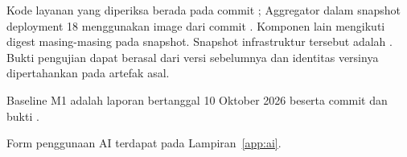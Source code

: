 \documentclass[11pt,a4paper]{report}
\begin{document}
Kode layanan yang diperiksa berada pada commit ; Aggregator dalam snapshot deployment 18 menggunakan image dari commit . Komponen lain mengikuti digest masing-masing pada snapshot. Snapshot infrastruktur tersebut adalah . Bukti pengujian dapat berasal dari versi sebelumnya dan identitas versinya dipertahankan pada artefak asal.

Baseline M1 adalah laporan bertanggal 10 Oktober 2026 beserta commit  dan bukti .

Form penggunaan AI terdapat pada Lampiran~\ref{app:ai}.
\tableofcontents
\clearpage
{}









\appendix


\end{document}
